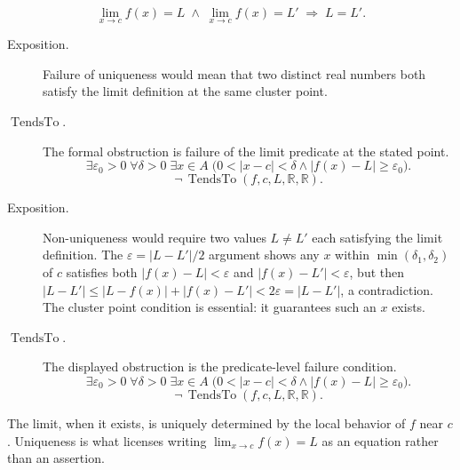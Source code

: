 \begin{remark*}
\[
  \lim_{x\to c}f(x)=L
  \;\wedge\;
  \lim_{x\to c}f(x)=L'
  \;\Rightarrow\; L = L'.
\]
\end{remark*}

\begin{remark*}
\begin{description}
  \item[Exposition.]
Failure of uniqueness would mean that two distinct real numbers both satisfy
the limit definition at the same cluster point.


  \item[\(\operatorname{TendsTo}.\)]
  The formal obstruction is failure of the limit predicate at the stated point.
  \[
  \exists\varepsilon_0>0\;\forall\delta>0\;\exists x\in A\;
  \bigl(0<|x-c|<\delta\land |f(x)-L|\ge\varepsilon_0\bigr).
  \]
  \[
  \neg\,\operatorname{TendsTo}(f,c,L,\mathbb{R},\mathbb{R}).
  \]
\end{description}
\end{remark*}

\begin{remark*}
\begin{description}
  \item[Exposition.]
Non-uniqueness would require two values $L \neq L'$ each satisfying
the limit definition. The $\varepsilon = |L-L'|/2$ argument shows
any $x$ within $\min(\delta_1,\delta_2)$ of $c$ satisfies both
$|f(x)-L| < \varepsilon$ and $|f(x)-L'| < \varepsilon$, but then
$|L-L'| \leq |L-f(x)|+|f(x)-L'| < 2\varepsilon = |L-L'|$, a
contradiction. The cluster point condition is essential: it guarantees
such an $x$ exists.


  \item[\(\operatorname{TendsTo}.\)]
  The displayed obstruction is the predicate-level failure condition.
  \[
  \exists\varepsilon_0>0\;\forall\delta>0\;\exists x\in A\;
  \bigl(0<|x-c|<\delta\land |f(x)-L|\ge\varepsilon_0\bigr).
  \]
  \[
  \neg\,\operatorname{TendsTo}(f,c,L,\mathbb{R},\mathbb{R}).
  \]
\end{description}
\end{remark*}

\begin{remark*}[Interpretation]
The limit, when it exists, is uniquely determined by the local
behavior of $f$ near $c$. Uniqueness is what licenses writing
$\lim_{x\to c} f(x) = L$ as an equation rather than an assertion.
\end{remark*}


